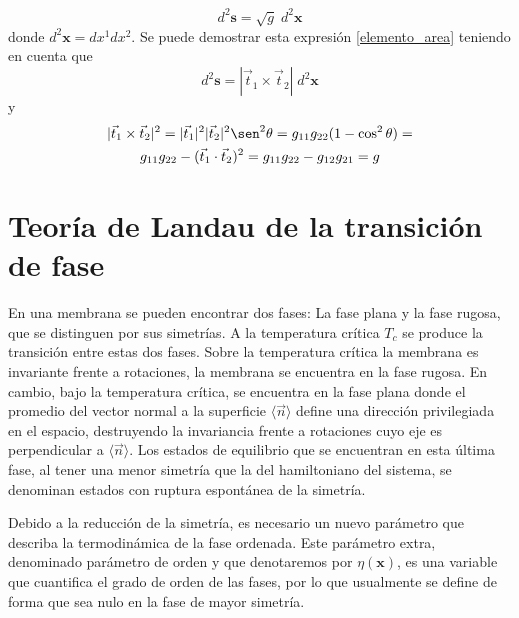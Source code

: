 \begin{equation}\label{elemento_area}
d^2\mathbf{s}=\sqrt{g}\;d^2\mathbf{x}
\end{equation}
donde $d^2\mathbf{x}=dx^1dx^2$. Se puede demostrar esta expresión
\eqref{elemento_area} teniendo en cuenta que
\begin{equation*}
d^2\mathbf{s}=|\vec{t}_1\times\vec{t}_2|\;d^2\mathbf{x}
\end{equation*}
y
\begin{multline*}
|\vec{t}_1\times\vec{t}_2|^2=|\vec{t}_1|^2|\vec{t}_2|^2\sen^2
\theta=g_{11}g_{22}(1-\cos^2 \theta)=\\
g_{11}g_{22}-(\vec{t}_1\cdot\vec{t}_2)^2=g_{11}g_{22}-g_{12}g_{21}=g
\end{multline*}

\section{Teoría de Landau de la transición de fase}

En una membrana se pueden encontrar dos fases: La fase plana y la fase
rugosa, que se distinguen por sus simetrías. A la temperatura crítica $T_c$ se
produce la transición entre estas dos fases. Sobre la temperatura crítica la
membrana es invariante frente a rotaciones, 
la membrana se encuentra en la fase rugosa. En cambio, bajo la temperatura
crítica, se encuentra en la fase plana donde el promedio del vector normal a
la superficie $\langle \vec{n}\rangle$ define una dirección privilegiada en el
espacio, destruyendo la invariancia frente a rotaciones cuyo eje es
perpendicular a $\langle \vec{n}\rangle$. Los estados de equilibrio que se
encuentran en esta última fase, al tener una menor simetría que la del
hamiltoniano del sistema, se denominan estados con ruptura espontánea de la
simetría. 
 
Debido a la reducción de la simetría, es necesario un nuevo parámetro que 
describa la termodinámica de la fase ordenada. Este parámetro
extra, denominado parámetro de orden y que denotaremos por $\eta(\mathbf{x})$,
es una 
variable que cuantifica el grado de orden de
las fases, por lo que usualmente se define de forma que sea nulo en la fase
de mayor simetría.

\begin{figure}[h]
\centering
{}
\quad
{}
\end{figure}

